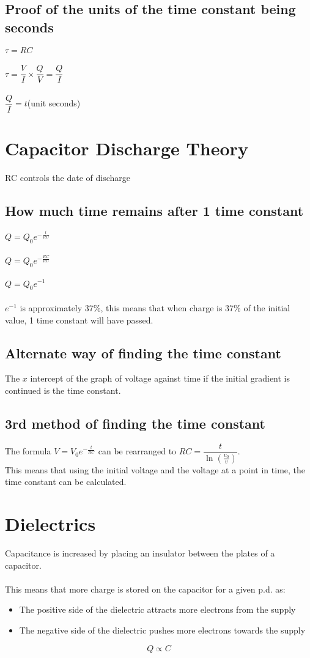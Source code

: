 \documentclass{article}[18pt]
\begin{document}
\subsection{Proof of the units of the time constant being seconds}
$\tau=RC$\\\\
$\tau=\dfrac{V}{I}\times\dfrac{Q}{V}=\dfrac{Q}{I}$\\
\\
$\dfrac{Q}{I}=t$(unit seconds)
\section{Capacitor Discharge Theory}
RC controls the date of discharge
\subsection{How much time remains after 1 time constant}
$Q=Q_0e^{-\frac{t}{RC}}$\\
\\
$Q=Q_0e^{-\frac{RC}{RC}}$\\
\\
$Q=Q_0e^{-1}$\\
\\
$e^{-1}$ is approximately 37\%, this means that when charge is 37\% of the initial value, 1 time constant will have passed.
\subsection{Alternate way of finding the time constant}
The $x$ intercept of the graph of voltage against time if the initial gradient is continued is the time constant.
\subsection{3rd method of finding the time constant}
The formula $V=V_0e^{-\frac{t}{RC}}$ can be rearranged to $RC=\dfrac{t}{\ln(\frac{v_0}{v})}$.\\
This means that using the initial voltage and the voltage at a point in time, the time constant can be calculated.
\section{Dielectrics}
Capacitance is increased by placing an insulator between the plates of a capacitor.\\
\\
This means that more charge is stored on the capacitor for a given p.d. as:
\begin{itemize}
\item The positive side of the dielectric attracts more electrons from the supply
\item The negative side of the dielectric pushes more electrons towards the supply
\end{itemize}
$$ Q\propto C$$
\end{document}
